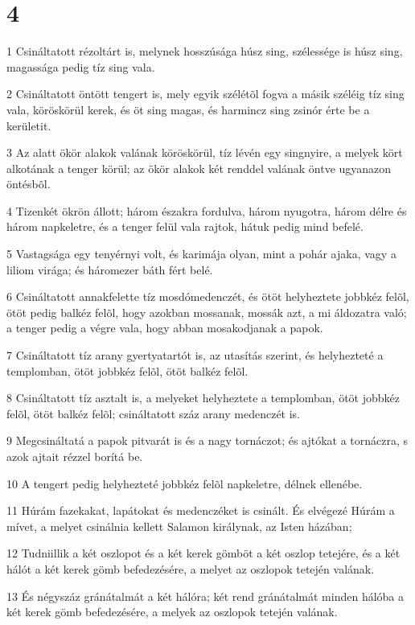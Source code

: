 \chapter{4}

\par 1 Csináltatott rézoltárt is, melynek hosszúsága húsz sing, szélessége is húsz sing, magassága pedig tíz sing vala.
\par 2 Csináltatott öntött tengert is, mely egyik szélétõl fogva a másik széléig tíz sing vala, köröskörül kerek, és öt sing magas, és harmincz sing zsinór érte be a kerületit.
\par 3 Az alatt ökör alakok valának köröskörül, tíz lévén egy singnyire, a melyek kört alkotának a tenger körül; az ökör alakok két renddel valának öntve ugyanazon öntésbõl.
\par 4 Tizenkét ökrön állott; három északra fordulva, három nyugotra, három délre és három napkeletre, és a tenger felül vala rajtok, hátuk pedig mind befelé.
\par 5 Vastagsága egy tenyérnyi volt, és karimája olyan, mint a pohár ajaka, vagy a liliom virága; és háromezer báth fért belé.
\par 6 Csináltatott annakfelette tíz mosdómedenczét, és ötöt helyheztete jobbkéz felõl, ötöt pedig balkéz felõl, hogy azokban mossanak, mossák azt, a mi áldozatra való; a tenger pedig a végre vala, hogy abban mosakodjanak a papok.
\par 7 Csináltatott tíz arany gyertyatartót is, az utasítás szerint, és helyhezteté a templomban, ötöt jobbkéz felõl, ötöt balkéz felõl.
\par 8 Csináltatott tíz asztalt is, a melyeket helyheztete a templomban, ötöt jobbkéz felõl, ötöt balkéz felõl; csináltatott száz arany medenczét is.
\par 9 Megcsináltatá a papok pitvarát is és a nagy tornáczot; és ajtókat a tornáczra, s azok ajtait rézzel borítá be.
\par 10 A tengert pedig helyhezteté jobbkéz felõl napkeletre, délnek ellenébe.
\par 11 Húrám fazekakat, lapátokat és medenczéket is csinált. És elvégezé Húrám a mívet, a melyet csinálnia kellett Salamon királynak, az Isten házában;
\par 12 Tudniillik a két oszlopot és a két kerek gömböt a két oszlop tetejére, és a két hálót a két kerek gömb befedezésére, a melyet az oszlopok tetején valának.
\par 13 És négyszáz gránátalmát a két hálóra; két rend gránátalmát minden hálóba a két kerek gömb befedezésére, a melyek az oszlopok tetején valának.
